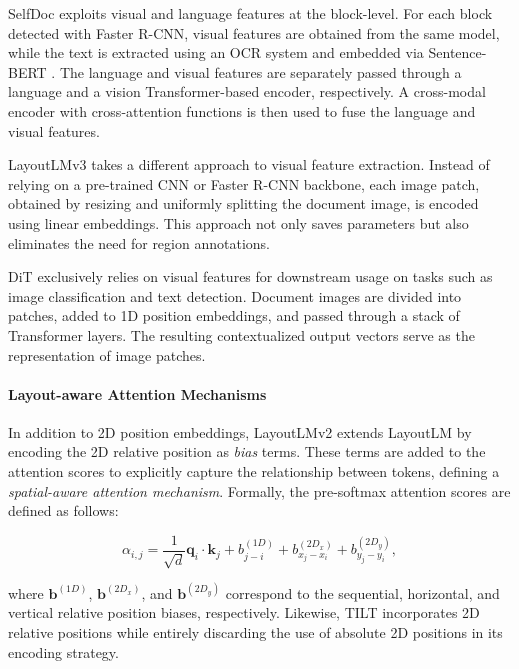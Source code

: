 SelfDoc \citep{li2021selfdoc} exploits visual and language features at the block-level. For each block detected with Faster R-CNN, visual features are obtained from the same model, while the text is extracted using an \ac{OCR} system and embedded via Sentence-BERT \citep{reimers2019sentence}. The language and visual features are separately passed through a language and a vision Transformer-based encoder, respectively. A cross-modal encoder with cross-attention functions is then used to fuse the language and visual features.  

LayoutLMv3 \citep{huang2022layoutlmv3} takes a different approach to visual feature extraction. Instead of relying on a pre-trained \ac{CNN} or Faster R-CNN backbone, each image patch, obtained by resizing and uniformly splitting the document image, is encoded using linear embeddings. This approach not only saves parameters but also eliminates the need for region annotations.

\ac{DiT} \citep{li2022dit} exclusively relies on visual features for downstream usage on tasks such as image classification and text detection. Document images are divided into patches, added to 1D position embeddings, and passed through a stack of Transformer layers. The resulting contextualized output vectors serve as the representation of image patches.

\paragraph{Layout-aware Attention Mechanisms}

In addition to 2D position embeddings, LayoutLMv2 \citep{xu2020layoutlmv2} extends LayoutLM by encoding the 2D relative position as \textit{bias} terms. These terms are added to the attention scores to explicitly capture the relationship between tokens, defining a \textit{spatial-aware attention mechanism}. Formally, the pre-softmax attention scores are defined as follows:

\begin{equation}
    \alpha_{i,j} = \dfrac{1}{\sqrt{d}} \bm{q}_i \cdot \bm{k}_j + b^{(1D)}_{j - i} + b^{(2D_x)}_{x_j - x_i} + b^{(2D_y)}_{y_j - y_i},
\end{equation}

\noindent where $\bm{b}^{(1D)}$, $\bm{b}^{(2D_x)}$, and $\bm{b}^{(2D_y)}$ correspond to the sequential, horizontal, and vertical relative position biases, respectively. Likewise, TILT \citep{powalski2021going} incorporates 2D relative positions while entirely discarding the use of absolute 2D positions in its encoding strategy. 


